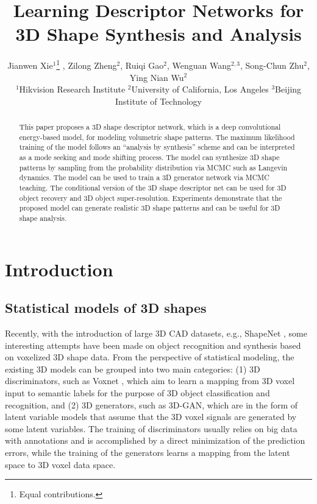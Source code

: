 \documentclass[10pt,twocolumn,letterpaper]{article}
\begin{document}
\title{Learning Descriptor Networks for 3D Shape Synthesis and Analysis}

\newcommand*\samethanks[1][\value{footnote}]{\footnotemark[#1]}

\author{Jianwen Xie$^{1}$\thanks{Equal contributions.} , Zilong Zheng$^{2}$\samethanks[1] , Ruiqi Gao$^{2}$, Wenguan Wang$^{2,3}$, Song-Chun Zhu$^{2}$, Ying Nian Wu$^{2}$\\
$^{1}$Hikvision Research Institute 
$^{2}$University of California, Los Angeles 
$^{3}$Beijing Institute of Technology\\
}



\maketitle

\begin{abstract}


This paper proposes a 3D shape descriptor network, which is a deep convolutional energy-based model, for  modeling volumetric shape patterns. The maximum likelihood training of the model follows an ``analysis by synthesis'' scheme and can be interpreted as a mode seeking and mode shifting process. The model can synthesize 3D shape patterns by sampling  from the probability distribution via MCMC such as Langevin dynamics. The model can be used to train a 3D generator network via MCMC teaching. The conditional version of the 3D shape descriptor net can be used for 3D object recovery and 3D object super-resolution. Experiments demonstrate that the proposed model can generate realistic 3D shape patterns and can be useful for 3D shape analysis.


\end{abstract}

\section{Introduction}

\subsection{Statistical models of 3D shapes}

Recently, with the introduction of large 3D CAD datasets, e.g., ShapeNet \cite{wu20153d, chang2015shapenet}, some interesting attempts \cite{girdhar2016learning, su2015multi,qi2016volumetric} have been made on object recognition and synthesis based on voxelized 3D shape data. From the perspective of statistical modeling, the existing 3D models can be grouped into two main categories: (1) 3D discriminators, such as Voxnet \cite{maturana2015voxnet}, which aim to learn a mapping from 3D voxel input to semantic labels for the purpose of 3D object classification and recognition, and (2) 3D generators, such as 3D-GAN\cite{3dgan}, which are in the form of latent variable models that assume that the 3D voxel signals are generated by some latent variables. The training of discriminators usually relies on big data with annotations and is accomplished by a direct minimization of the prediction errors, while the training of the generators  learns a mapping from the latent space to 3D voxel data space. 
\end{document}
